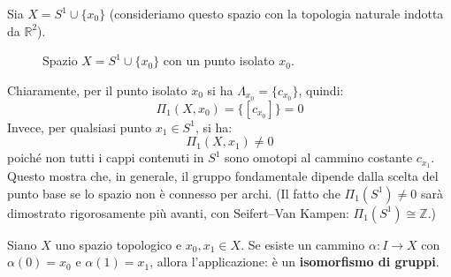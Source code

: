 \begin{ejemplo}
Sia $X = S^1 \cup \{x_0\}$ (consideriamo questo spazio con la topologia naturale indotta da $\mathbb{R}^2$).

\begin{figure}[H]
    \centering
    \caption{Spazio $X = S^1 \cup \{x_0\}$ con un punto isolato $x_0$.}
\end{figure}

Chiaramente, per il punto isolato $x_0$ si ha $\Lambda_{x_0} = \{c_{x_0}\}$, quindi:
\[
\Pi_1(X, x_0) = \{[c_{x_0}]\} = 0
\]
Invece, per qualsiasi punto $x_1 \in S^1$, si ha:
\[
\Pi_1(X, x_1) \neq 0
\]
poiché non tutti i cappi contenuti in $S^1$ sono omotopi al cammino costante $c_{x_1}$. Questo mostra che, in generale, il gruppo fondamentale dipende dalla scelta del punto base se lo spazio non è connesso per archi. (Il fatto che $\Pi_1(S^1) \neq 0$ sarà dimostrato rigorosamente pi\`u avanti, con Seifert--Van Kampen: $\Pi_1(S^1) \cong \mathbb{Z}$.)
\end{ejemplo}

\vspace{1.5em}

\begin{teo}
Siano $X$ uno spazio topologico e $x_0, x_1 \in X$. Se esiste un cammino $\alpha: I \to X$ con $\alpha(0) = x_0$ e $\alpha(1) = x_1$, allora l'applicazione:
è un \textbf{isomorfismo di gruppi}.
\end{teo}

